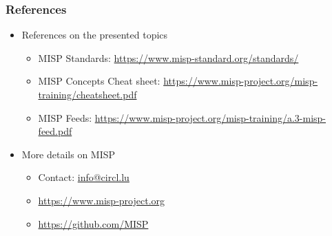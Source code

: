 \begin{frame}
    \frametitle{References}
    \begin{itemize}
        \item References on the presented topics
        \begin{itemize}
            \item MISP Standards: \url{https://www.misp-standard.org/standards/}
            \item MISP Concepts Cheat sheet: \url{https://www.misp-project.org/misp-training/cheatsheet.pdf}
            \item MISP Feeds: \url{https://www.misp-project.org/misp-training/a.3-misp-feed.pdf}
        \end{itemize}
        \item More details on MISP
        \begin{itemize}
            \item Contact: \url{info@circl.lu}
            \item \url{https://www.misp-project.org}
            \item \url{https://github.com/MISP}
        \end{itemize}
    \end{itemize}
\end{frame}
